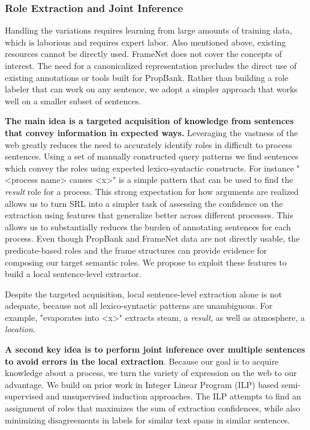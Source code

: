 \subsubsection*{Role Extraction and Joint Inference}

Handling the variations requires learning from large amounts of training data, which is laborious and requires expert labor.
Also mentioned above, existing resources cannot be directly used. FrameNet does not cover the concepts of interest. 
The need for a canonicalized representation precludes the direct use of existing annotations or tools built for PropBank.
Rather than building a role labeler that can work on any sentence, we adopt a simpler approach that works well on a smaller subset of sentences.

{\bf The main idea is a targeted acquisition of knowledge from sentences that convey information in expected ways.}
Leveraging the vastness of the web greatly reduces the need to accurately identify roles in difficult to process sentences.
Using a set of manually constructed query patterns we find sentences which convey the roles using expected lexico-syntactic constructs. 
For instance "<process name> causes <x>" is a simple pattern that can be used to find the {\em result} role for a process. 
This strong expectation for how arguments are realized allows us to turn SRL into a simpler task of assessing the confidence on the extraction using features that generalize better across different processes.  
This allows us to substantially reduces the burden of annotating sentences for each process.
Even though PropBank and FrameNet data are not directly usable, the predicate-based roles and the frame structures can provide evidence for composing our target semantic roles. 
We propose to exploit these features to build a local sentence-level extractor.


Despite the targeted acquisition, local sentence-level extraction alone is not adequate, because not all lexico-syntactic patterns are unambiguous. 
For example, "evaporates into <x>" extracts steam, a {\em result}, as well as atmosphere, a {\em location}. 

{\bf A second key idea is to perform joint inference over multiple sentences to avoid errors in the local extraction}.
Because our goal is to acquire knowledge about a process, we turn the variety of expression on the web to our advantage. 
We build on prior work in Integer Linear Program (ILP) based semi-supervised and unsupervised induction approaches. 
The ILP attempts to find an assignment of roles that maximizes the sum of extraction confidences, 
while also minimizing disagreements in labels for similar text spans in similar sentences.

